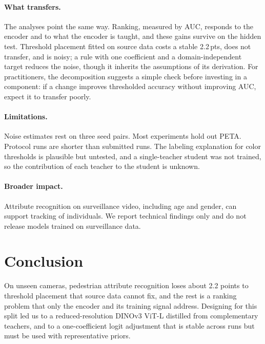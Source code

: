 \documentclass[10pt,twocolumn,letterpaper]{article}
\newcommand{\pts}{\,pts}
\begin{document}
\paragraph{What transfers.} The analyses point the same way. Ranking, measured by AUC, responds to the encoder and to what the encoder is taught, and these gains survive on the hidden test. Threshold placement fitted on source data costs a stable 2.2\pts, does not transfer, and is noisy; a rule with one coefficient and a domain-independent target reduces the noise, though it inherits the assumptions of its derivation. For practitioners, the decomposition suggests a simple check before investing in a component: if a change improves thresholded accuracy without improving AUC, expect it to transfer poorly.

\paragraph{Limitations.} Noise estimates rest on three seed pairs. Most experiments hold out PETA. Protocol runs are shorter than submitted runs. The labeling explanation for color thresholds is plausible but untested, and a single-teacher student was not trained, so the contribution of each teacher to the student is unknown.

\paragraph{Broader impact.} Attribute recognition on surveillance video, including age and gender, can support tracking of individuals. We report technical findings only and do not release models trained on surveillance data.

\section{Conclusion}

On unseen cameras, pedestrian attribute recognition loses about 2.2 points to threshold placement that source data cannot fix, and the rest is a ranking problem that only the encoder and its training signal address. Designing for this split led us to a reduced-resolution DINOv3 ViT-L distilled from complementary teachers, and to a one-coefficient logit adjustment that is stable across runs but must be used with representative priors.
\end{document}
